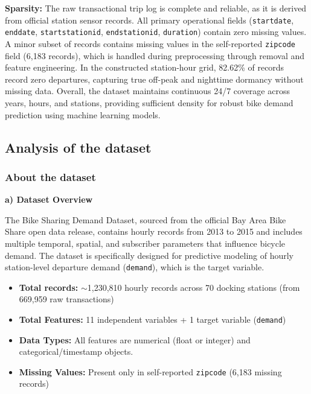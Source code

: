 \documentclass[12pt, a4paper]{article}
\renewcommand{\_}{\textunderscore\allowbreak}
\begin{document}
\vspace{0.2cm}
\noindent \textbf{Sparsity:} The raw transactional trip log is complete and reliable, as it is derived from official station sensor records. All primary operational fields (\texttt{start\_date}, \texttt{end\_date}, \texttt{start\_station\_id}, \texttt{end\_station\_id}, \texttt{duration}) contain zero missing values. A minor subset of records contains missing values in the self-reported \texttt{zip\_code} field (6,183 records), which is handled during preprocessing through removal and feature engineering. In the constructed station-hour grid, 82.62\% of records record zero departures, capturing true off-peak and nighttime dormancy without missing data. Overall, the dataset maintains continuous 24/7 coverage across years, hours, and stations, providing sufficient density for robust bike demand prediction using machine learning models.

\subsection{Analysis of the dataset}

\subsubsection{About the dataset}

\noindent \textbf{a) Dataset Overview}

The Bike Sharing Demand Dataset, sourced from the official Bay Area Bike Share open data release, contains hourly records from 2013 to 2015 and includes multiple temporal, spatial, and subscriber parameters that influence bicycle demand. The dataset is specifically designed for predictive modeling of hourly station-level departure demand (\texttt{demand}), which is the target variable.
\begin{itemize}
    \item \textbf{Total records:} $\sim$1,230,810 hourly records across 70 docking stations (from 669,959 raw transactions)
    \item \textbf{Total Features:} 11 independent variables + 1 target variable (\texttt{demand})
    \item \textbf{Data Types:} All features are numerical (float or integer) and categorical/timestamp objects.
    \item \textbf{Missing Values:} Present only in self-reported \texttt{zip\_code} (6,183 missing records)
\end{itemize}
\end{document}

